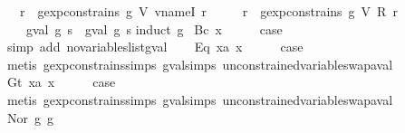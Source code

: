 \begin{isabellebody}
\ \ \ {\isachardoublequoteopen}{\isasymforall}r{\isachardot}\ {\isasymnot}\ gexp{\isacharunderscore}constrains\ g\ {\isacharparenleft}V\ {\isacharparenleft}vname{\isachardot}I\ r{\isacharparenright}{\isacharparenright}\ {\isasymLongrightarrow}\isanewline
\ \ \ \ {\isasymforall}r{\isachardot}\ {\isasymnot}\ gexp{\isacharunderscore}constrains\ g\ {\isacharparenleft}V\ {\isacharparenleft}R\ r{\isacharparenright}{\isacharparenright}\ {\isasymLongrightarrow}\isanewline
\ \ \ \ gval\ g\ s\ {\isacharequal}\ gval\ g\ s{\isacharprime}{\isachardoublequoteclose}\isanewline
%
\isadelimproof
%
\endisadelimproof
%
\isatagproof
{}\isamarkupfalse%
{\isacharparenleft}induct\ g{\isacharparenright}\isanewline
{}\isamarkupfalse%
\ {\isacharparenleft}Bc\ x{\isacharparenright}\isanewline
\ \ \isamarkupfalse%
\ \isamarkupfalse%
\ {\isacharquery}case\isanewline
\ \ \ \ \isamarkupfalse%
\ {\isacharparenleft}simp\ add{\isacharcolon}\ no{\isacharunderscore}variables{\isacharunderscore}list{\isacharunderscore}gval{\isacharparenright}\isanewline
{}\isamarkupfalse%
\isanewline
\ \ \isamarkupfalse%
\ {\isacharparenleft}Eq\ x{}a\ x{}{\isacharparenright}\isanewline
\ \ \isamarkupfalse%
\ \isamarkupfalse%
\ {\isacharquery}case\isanewline
\ \ \ \ \isamarkupfalse%
\ {\isacharparenleft}metis\ gexp{\isacharunderscore}constrains{\isachardot}simps{\isacharparenleft}{}{\isacharparenright}\ gval{\isachardot}simps{\isacharparenleft}{}{\isacharparenright}\ unconstrained{\isacharunderscore}variable{\isacharunderscore}swap{\isacharunderscore}aval{\isacharparenright}\isanewline
{}\isamarkupfalse%
\isanewline
\ \ \isamarkupfalse%
\ {\isacharparenleft}Gt\ x{}a\ x{}{\isacharparenright}\isanewline
\ \ \isamarkupfalse%
\ \isamarkupfalse%
\ {\isacharquery}case\isanewline
\ \ \ \ \isamarkupfalse%
\ {\isacharparenleft}metis\ gexp{\isacharunderscore}constrains{\isachardot}simps{\isacharparenleft}{}{\isacharparenright}\ gval{\isachardot}simps{\isacharparenleft}{}{\isacharparenright}\ unconstrained{\isacharunderscore}variable{\isacharunderscore}swap{\isacharunderscore}aval{\isacharparenright}\isanewline
{}\isamarkupfalse%
\isanewline
\ \ \isamarkupfalse%
\ {\isacharparenleft}Nor\ g{}\ g{}{\isacharparenright}\isanewline
\ \ \isamarkupfalse%

\end{isabellebody}
